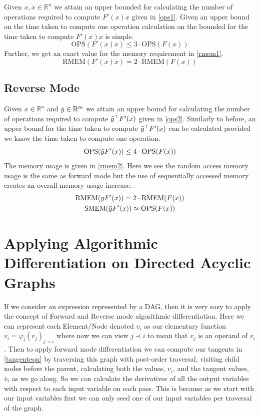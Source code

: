 \documentclass{article}
\begin{document}
Given $x, \Dot{x} \in \mathbb{R}^n$ we attain an upper bounded for calculating the number of operations required to compute $F'(x) \Dot{x}$ given in \eqref{ops1}. Given an upper bound on the time taken to compute one operation calculation on the bounded for the time taken to compute $F'(x) \Dot{x}$ is simple.
\begin{equation} \label{ops1}
    \text{OPS}(F'(x) \Dot{x}) \leq 3 \cdot \text{OPS}(F(x))
\end{equation}
Further, we get an exact value for the memory requirement in \eqref{rmem1}.
\begin{equation} \label{rmem1}
    \text{RMEM}(F'(x) \Dot{x}) = 2 \cdot \text{RMEM}(F(x))
\end{equation}

\subsection{Reverse Mode}

Given $x \in \mathbb{R}^n$ and $\Bar{y} \in \mathbb{R}^m$ we attain an upper bound for calculating the number of operations required to compute $\Bar{y}^\top F'(x)$ given in \eqref{ops2}. Similarly to before, an upper bound for the time taken to compute $\Bar{y}^\top F'(x)$ can be calculated provided we know the time taken to compute one operation.
\begin{equation} \label{ops2}
    \text{OPS}(\Bar{y} F'(x)) \leq 4 \cdot \text{OPS}(F(x))
\end{equation}
The memory usage is given in \eqref{rmem2}. Here we see the random access memory usage is the same as forward mode but the use of sequentially accessed memory creates an overall memory usage increase.
\begin{equation} \label{rmem2}
    \begin{gathered}
        \text{RMEM}(\Bar{y} F'(x)) = 2 \cdot \text{RMEM}(F(x)) \\ 
        \text{SMEM}(\Bar{y} F'(x)) \approx \text{OPS}(F(x))
    \end{gathered}
\end{equation}

\section{Applying Algorithmic Differentiation on Directed Acyclic Graphs}

If we consider an expression represented by a DAG, then it is very easy to apply the concept of Forward and Reverse mode algorithmic differentiation. Here we can represent each Element/Node denoted $v_i$ as our elementary function $v_i = \varphi_i (v_j)_{j \prec i}$ where now we can view $j \prec i$ to mean that $v_j$ is an operand of $v_i$. Then to apply forward mode differentiation we can compute our tangents in \eqref{tangentequ} by traversing this graph with post-order traversal, visiting child nodes before the parent, calculating both the values, $v_i$, and the tangent values, $\Dot{v_i}$ as we go along. So we can calculate the derivatives of all the output variables with respect to each input variable on each pass. This is because as we start with our input variables first we can only seed one of our input variables per traversal of the graph.
\end{document}
